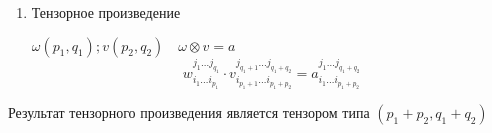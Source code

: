 \begin{enumerate}[resume]
    \item Тензорное произведение
    
    $\omega (p_1, q_1); v (p_2, q_2) \quad \omega\otimes v = a$
    $$w^{j_1\ldots j_{q_1}}_{i_1\ldots i_{p_1}} \cdot v^{j_{q_1+1} \ldots j_{q_1 + q_2}}_{i_{p_1+1}\ldots i_{p_1+p_2}}=a^{j_1\ldots j_{q_1+q_2}}_{i_1\ldots i_{p_1+p_2}}$$
\end{enumerate}
\begin{lemma}
    Результат тензорного произведения является тензором типа $(p_1+p_2, q_1+q_2)$
\end{lemma}

